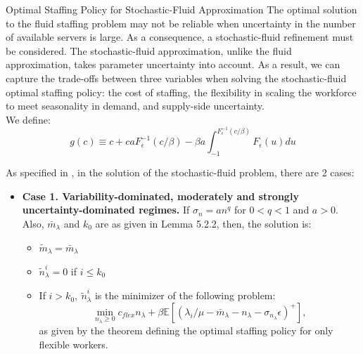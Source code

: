 \documentclass[8pt]{beamer}
\begin{document}
\begin{frame}{Optimal Staffing Policy for Stochastic-Fluid Approximation}
The optimal solution to the fluid staffing problem may not be reliable when uncertainty in the number of available servers is large. As a consequence, a stochastic-fluid refinement must be considered. The stochastic-fluid approximation, unlike the fluid approximation, takes parameter uncertainty into account. As a result, we can capture the trade-offs between three variables when solving the stochastic-fluid optimal staffing policy: the cost of staffing, the flexibility in scaling the workforce to meet seasonality in demand, and supply-side uncertainty. \\ We define:
\[g(c) \equiv c + caF_{\epsilon}^{-1}(c/\beta)-\beta a\int_{-1}^{F_{\epsilon}^{-1}(c/\beta)}F_{\epsilon}(u) du\]
\begin{theorem}
As specified in \cite{dong}, in the solution of the stochastic-fluid problem, there are 2 cases:
\begin{itemize}
    \item \textbf{Case 1. Variability-dominated, moderately and strongly uncertainty-dominated
regimes.}  If $\sigma_n = an^q$ for $0 < q < 1$ and $a > 0$. Also, $\bar{m}_{\lambda}$ and $k_0$ are as given in Lemma 5.2.2, then, the solution is:
\begin{itemize}
    \item $\tilde{m}_{\lambda}=\bar{m}_{\lambda}$
    \item $\tilde{n}_{\lambda}^i=0$ if $i \leq k_0$
    \item If $i>k_0, \ \tilde{n}_{\lambda}^i$ is the minimizer of the following problem:
    \[\min_{n_{\lambda}\geq0} c_{flex}n_{\lambda} + \beta\mathbb{E}[(\lambda_i/\mu - \bar{m}_{\lambda} - n_{\lambda} -\sigma_{n_{\lambda}}\epsilon)^+],\]
    as given by the theorem defining the optimal staffing policy for only flexible workers.
\end{itemize}
\end{itemize}
\end{theorem}
\end{frame}
\end{document}
